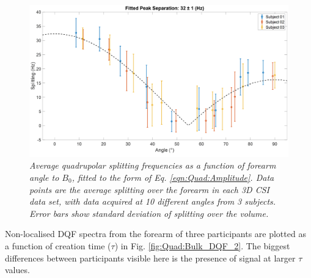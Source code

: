\begin{figure}
    \centering
    \includegraphics[width=1\textwidth]{Figures/Quad/Split_Angle_2.png}
    \caption{\textit{Average quadrupolar splitting frequencies as a function of forearm angle to $B_0$, fitted to the form of Eq. \ref{eqn:Quad:Amplitude}. Data points are the average splitting over the forearm in each 3D \ac{CSI} data set, with data acquired at 10 different angles from 3 subjects. Error bars show standard deviation of splitting over the volume.}}
    \label{fig:Quad:Split_Angle_2}
\end{figure}

Non-localised \ac{DQF} spectra from the forearm of three participants are plotted as a function of creation time ($\tau$) in Fig. \ref{fig:Quad:Bulk_DQF_2}. The biggest differences between participants visible here is the presence of signal at larger $\tau$ values.

